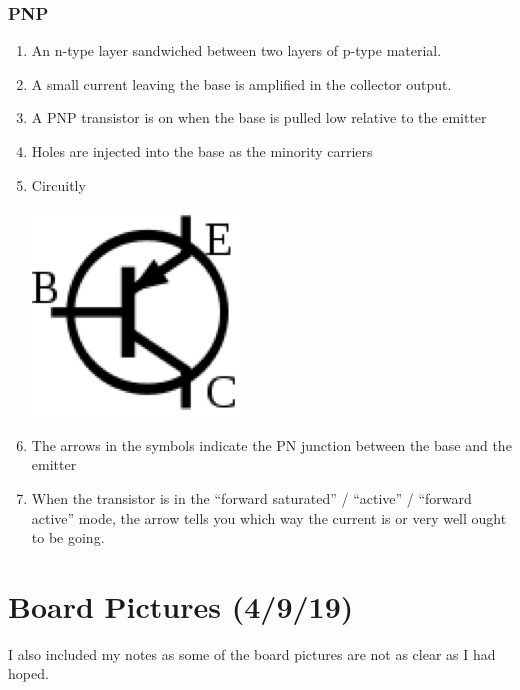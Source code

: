 \documentclass[11pt]{book}
\begin{document}
\subsubsection{PNP}
\begin{enumerate}
	\item An n-type layer sandwiched between two layers of p-type material.
	\item A small current leaving the base is amplified in the collector output.
	\item A PNP transistor is on when the base is pulled low relative to the emitter
	\item Holes are injected into the base as the minority carriers
	\item Circuitly
	\begin{center}
		\includegraphics{figures/20.21.png}
	\end{center}
	\item The arrows in the symbols indicate the PN junction between the base and the emitter
	\item When the transistor is in the ``forward saturated'' / ``active'' / ``forward active'' mode, the arrow tells you which way the current is or very well ought to be going.
\end{enumerate}



\section{Board Pictures (4/9/19)}
I also included my notes as some of the board pictures are not as clear as I had hoped.
\end{document}
